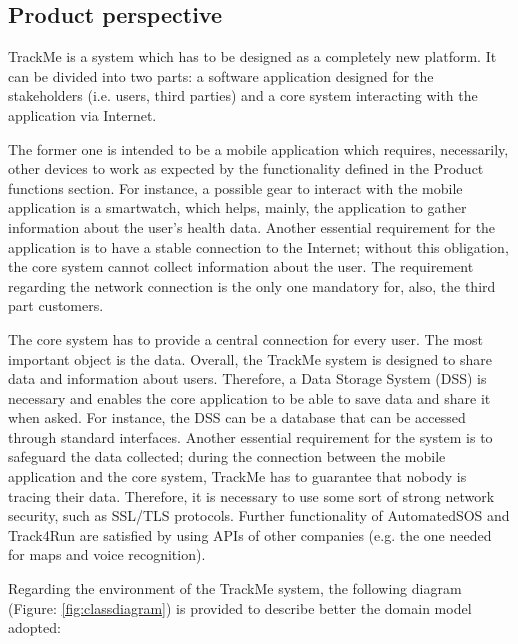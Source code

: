 \subsection{Product perspective}
TrackMe is a system which has to be designed as a completely new platform. It can be divided into 
two parts: a software application designed for the stakeholders (i.e. users, third parties) and a 
core system interacting with the application via Internet. 
\par
The former one is intended to be a mobile application which requires, necessarily, other devices to work 
as expected by the functionality defined in the Product functions section. For instance, a possible gear 
to interact with the mobile application is a smartwatch, which helps, mainly, the application to 
gather information about the user's health data. Another essential requirement for the application is to have a stable connection to the Internet; without this obligation, the core system cannot 
collect information about the user. The requirement regarding the network connection is the only one mandatory for, also, the third part customers.
\par
The core system has to provide a central connection for every user. The most important object is the data. Overall, the TrackMe system is designed to share data and 
information about users. Therefore, a Data Storage System (DSS) is necessary and enables the 
core application to be able to save data and share it when asked. For instance, the DSS can be a 
database that can be accessed through standard interfaces. Another essential 
requirement for the system is to safeguard the data collected; during the connection between the 
mobile application and the core system, TrackMe has to guarantee that nobody is tracing their data. 
Therefore, it is necessary to use some sort of strong network security, such as SSL/TLS protocols. 
Further functionality of AutomatedSOS and Track4Run are satisfied by using APIs of other companies 
(e.g. the one needed for maps and voice recognition).
\\\par
Regarding the environment of the TrackMe system, the following diagram (Figure: \ref{fig:classdiagram}) 
is provided to describe better the domain model adopted:\\

